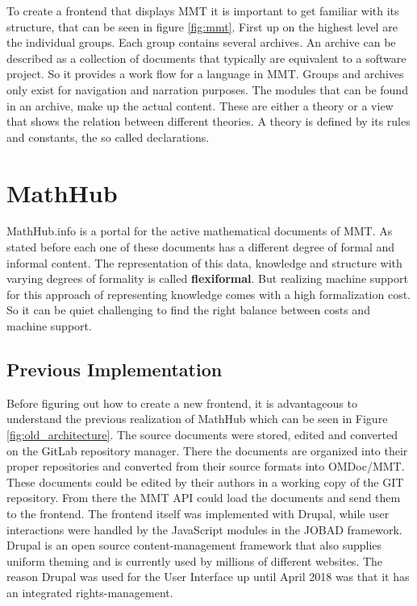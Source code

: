 \documentclass[11pt,a4paper]{article}
\begin{document}
To create a frontend that displays MMT it is important to get familiar with its structure, that can be seen in figure \ref{fig:mmt}.
First up on the highest level are the individual groups.
Each group contains several archives.
An archive can be described as a collection of documents that typically are equivalent to a software project.
So it provides a work flow for a language in MMT.
Groups and archives only exist for navigation and narration purposes.
The modules that can be found in an archive, make up the actual content.
These are either a theory or a view that shows the relation between different theories.
A theory is defined by its rules and constants, the so called declarations.
\cite{mmt}

\section{MathHub} \label{mathhub}
MathHub.info is a portal for the active mathematical documents of MMT.
As stated before each one of these documents has a different degree of formal and informal content.
The representation of this data, knowledge and structure with varying degrees of formality is called \textbf{flexiformal}.
But realizing machine support for this approach of representing knowledge comes with a high formalization cost.
So it can be quiet challenging to find the right balance between costs and machine support.
\subsection{Previous Implementation} \label{previous}
Before figuring out how to create a new frontend, it is advantageous to understand the previous realization of MathHub which can be seen in Figure \ref{fig:old_architecture}.
The source documents were stored, edited and converted on the GitLab repository manager.
There the documents are organized into their proper repositories and converted from their source formats into OMDoc/MMT.
These documents could be edited by their authors in a working copy of the GIT repository.
From there the MMT API could load the documents and send them to the frontend.
The frontend itself was implemented with Drupal\cite{comp}, while user interactions were handled by the JavaScript modules in the JOBAD framework.
Drupal is an open source content-management framework that also supplies uniform theming and is currently used by millions of different websites.
The reason Drupal was used for the User Interface up until April 2018 was that it has an integrated rights-management.
\end{document}
